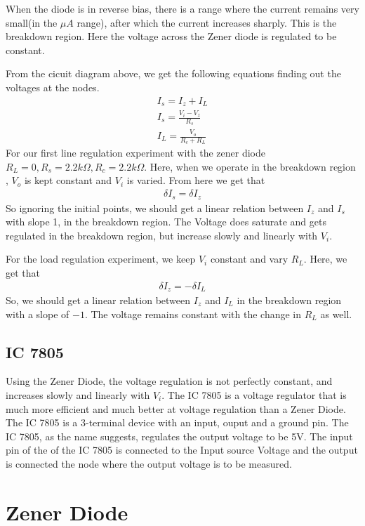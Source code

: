 \documentclass{scrartcl}
\newcommand{\1}{\mathbbm{1}}
\begin{document}
When the diode is in reverse bias, there is a range where the current remains very small(in the 
$\mu A$ range), after which the current increases sharply. This is the breakdown region. Here the 
voltage across the Zener diode is regulated to be constant.

From the cicuit diagram above, we get the following equations finding out the voltages at the nodes.
\begin{align}
	I_s = I_z + I_L \\ 
	I_s = \frac{V_i - V_z}{R_s} \\
	I_L = \frac{V_o}{R_c+R_L}
\end{align}
For our first line regulation experiment with the zener diode $R_L = 0, R_s = 2.2k\Omega, R_c = 2.2k\Omega$.
Here, when we operate in the breakdown region , $V_o$ is kept constant and $V_i$ is varied. From here 
we get that 
\begin{align}
	\delta I_s = \delta I_z
\end{align}
So ignoring the initial points, we should get a linear relation between $I_z$ and $I_s$ with slope 1, in the
breakdown region. The Voltage does saturate and gets regulated in the breakdown region, but
increase slowly and linearly with $V_i$.

For the load regulation experiment, we keep $V_i$ constant and vary $R_L$. Here, we get that
\begin{align}
	\delta I_z = -\delta I_L
\end{align}
So, we should get a linear relation between $I_z$ and $I_L$ in the breakdown region with 
a slope of $-1$. The voltage remains constant with the change in $R_L$ as well.
\subsection{IC 7805}
Using the Zener Diode, the voltage regulation is not perfectly constant, and increases 
slowly and linearly with $V_i$. The IC 7805 is a voltage regulator that is much more efficient
 and much better at voltage regulation than a Zener Diode. The IC 7805 is a 3-terminal device 
 with an input, ouput and a ground pin. The IC 7805, as the name suggests,
 regulates the output voltage to be 5V. The input pin of the of the IC 7805 is connected to the
 Input source Voltage and the output is connected the node where the output voltage is to be measured.

\section{Zener Diode}
\end{document}
